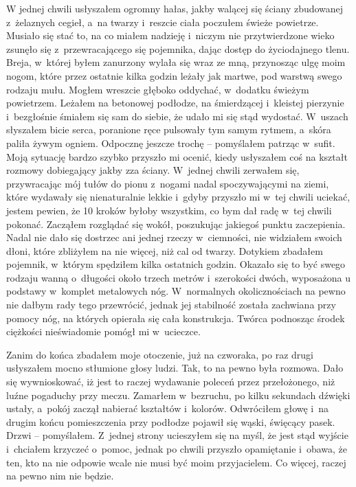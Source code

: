 W jednej chwili usłyszałem ogromny hałas, jakby walącej się ściany zbudowanej z~żelaznych cegieł, a~na twarzy i~reszcie ciała poczułem świeże powietrze. Musiało się stać to, na co miałem nadzieję i~niczym nie przytwierdzone wieko zsunęło się z~przewracającego się pojemnika, dając dostęp do życiodajnego tlenu. Breja, w~której byłem zanurzony wylała się wraz ze mną, przynosząc ulgę moim nogom, które przez ostatnie kilka godzin leżały jak martwe, pod warstwą swego rodzaju mułu. Mogłem wreszcie głęboko oddychać, w~dodatku świeżym powietrzem. Leżałem na betonowej podłodze, na śmierdzącej i~kleistej pierzynie i~bezgłośnie śmiałem się sam do siebie, że udało mi się stąd wydostać. W~uszach słyszałem bicie serca, poranione ręce pulsowały tym samym rytmem, a~skóra paliła żywym ogniem. Odpocznę jeszcze trochę – pomyślałem patrząc w~sufit. Moją sytuację bardzo szybko przyszło mi ocenić, kiedy usłyszałem coś na kształt rozmowy dobiegający jakby zza ściany. W~jednej chwili zerwałem się, przywracając mój tułów do pionu z~nogami nadal spoczywającymi na ziemi, które wydawały się nienaturalnie lekkie i~gdyby przyszło mi w~tej chwili uciekać, jestem pewien, że 10 kroków byłoby wszystkim, co bym dał radę w~tej chwili pokonać. Zacząłem rozglądać się wokół, poszukując jakiegoś punktu zaczepienia. Nadal nie dało się dostrzec ani jednej rzeczy w~ciemności, nie widziałem swoich dłoni, które zbliżyłem na nie więcej, niż cal od twarzy. Dotykiem zbadałem pojemnik, w~którym spędziłem kilka ostatnich godzin. Okazało się to być swego rodzaju wanną o~długości około trzech metrów i~szerokości dwóch, wyposażona u podstawy w~komplet metalowych nóg. W~normalnych okolicznościach na pewno nie dałbym rady tego przewrócić, jednak jej stabilność została zachwiana przy pomocy nóg, na których opierała się cała konstrukcja. Twórca podnosząc środek ciężkości nieświadomie pomógł mi w~ucieczce. 

Zanim do końca zbadałem moje otoczenie, już na czworaka, po raz drugi usłyszałem mocno stłumione głosy ludzi. Tak, to na pewno była rozmowa. Dało się wywnioskować, iż jest to raczej wydawanie poleceń przez przełożonego, niż luźne pogaduchy przy meczu. Zamarłem w~bezruchu, po kilku sekundach dźwięki ustały, a~pokój zaczął nabierać kształtów i~kolorów. Odwróciłem głowę i~na drugim końcu pomieszczenia przy podłodze pojawił się wąski, święcący pasek. Drzwi -- pomyślałem. Z~jednej strony ucieszyłem się na myśl, że jest stąd wyjście i~chciałem krzyczeć o~pomoc, jednak po chwili przyszło opamiętanie i~obawa, że ten, kto na nie odpowie wcale nie musi być moim przyjacielem. Co więcej, raczej na pewno nim nie będzie.

